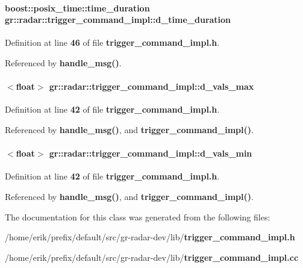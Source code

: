\paragraph[{d\+\_\+time\+\_\+duration}]{\setlength{\rightskip}{0pt plus 5cm}boost\+::posix\+\_\+time\+::time\+\_\+duration gr\+::radar\+::trigger\+\_\+command\+\_\+impl\+::d\+\_\+time\+\_\+duration}\label{classgr_1_1radar_1_1trigger__command__impl_a3a091fd034f0d5ef10c6c88e826ae964}


Definition at line {\bf 46} of file {\bf trigger\+\_\+command\+\_\+impl.\+h}.



Referenced by {\bf handle\+\_\+msg()}.

\paragraph[{d\+\_\+vals\+\_\+max}]{$<$float$>$ gr\+::radar\+::trigger\+\_\+command\+\_\+impl\+::d\+\_\+vals\+\_\+max}\label{classgr_1_1radar_1_1trigger__command__impl_a15917e29d18cbd9f5bd5ce1cea0b4a73}


Definition at line {\bf 42} of file {\bf trigger\+\_\+command\+\_\+impl.\+h}.



Referenced by {\bf handle\+\_\+msg()}, and {\bf trigger\+\_\+command\+\_\+impl()}.

\paragraph[{d\+\_\+vals\+\_\+min}]{$<$float$>$ gr\+::radar\+::trigger\+\_\+command\+\_\+impl\+::d\+\_\+vals\+\_\+min}\label{classgr_1_1radar_1_1trigger__command__impl_ac73f6ddca49210e0900468207c328c19}


Definition at line {\bf 42} of file {\bf trigger\+\_\+command\+\_\+impl.\+h}.



Referenced by {\bf handle\+\_\+msg()}, and {\bf trigger\+\_\+command\+\_\+impl()}.



The documentation for this class was generated from the following files\+:\begin{DoxyCompactItemize}
\item 
/home/erik/prefix/default/src/gr-\/radar-\/dev/lib/{\bf trigger\+\_\+command\+\_\+impl.\+h}\item 
/home/erik/prefix/default/src/gr-\/radar-\/dev/lib/{\bf trigger\+\_\+command\+\_\+impl.\+cc}\end{DoxyCompactItemize}
